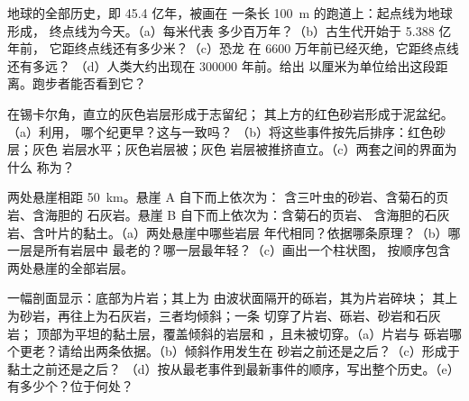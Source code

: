 \begin{exercise}[$\star\star$]\label{exo:g7:geological-time:8}
地球的全部历史，即 45.4 亿年，被画在
一条长 \qty{100}{m} 的跑道上：起点线为地球形成，
终点线为今天。（a）每米代表
多少百万年？（b）古生代开始于 5.388 亿年前，
它距终点线还有多少米？（c）恐龙
在 6600 万年前已经灭绝，它距终点线还有多远？
（d）人类大约出现在 \num{300000} 年前。给出
以厘米为单位给出这段距离。跑步者能否看到它？
\end{exercise}

\begin{exercise}[$\star\star$]\label{exo:g7:geological-time:9}
在锡卡尔角，直立的灰色岩层形成于志留纪；
其上方的红色砂岩形成于泥盆纪。（a）利用，
哪个纪更早？这与一致吗？
（b）将这些事件按先后排序：红色砂层；灰色
岩层水平；灰色岩层被；灰色
岩层被推挤直立。（c）两套之间的界面为什么
称为？
\end{exercise}

\begin{exercise}[$\star\star$]\label{exo:g7:geological-time:10}
两处悬崖相距 \qty{50}{km}。悬崖 A 自下而上依次为：
含三叶虫的砂岩、含菊石的页岩、含海胆的
石灰岩。悬崖 B 自下而上依次为：含菊石的页岩、
含海胆的石灰岩、含叶片的黏土。（a）两处悬崖中哪些岩层
年代相同？依据哪条原理？（b）哪一层是所有岩层中
最老的？哪一层最年轻？（c）画出一个柱状图，
按顺序包含两处悬崖的全部岩层。
\end{exercise}

\begin{exercise}[$\star\star\star$]\label{exo:g7:geological-time:11}
一幅剖面显示：底部为片岩；其上为
由波状面隔开的砾岩，其为片岩碎块；
其上为砂岩，再往上为石灰岩，三者均倾斜；一条
切穿了片岩、砾岩、砂岩和石灰岩；
顶部为平坦的黏土层，覆盖倾斜的岩层和
，且未被切穿。（a）片岩与
砾岩哪个更老？请给出两条依据。（b）倾斜作用发生在
砂岩之前还是之后？（c）形成于黏土之前还是之后？
（d）按从最老事件到最新事件的顺序，写出整个历史。（e）
有多少个？位于何处？
\end{exercise}


